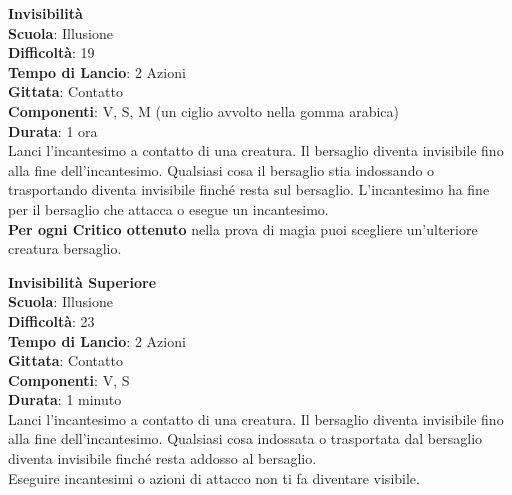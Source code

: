 \begin{multicols}{2}
\medskip\textbf{Invisibilità}\\
\textbf{Scuola}: Illusione\\
\textbf{Difficoltà}: 19\\
\textbf{Tempo di Lancio}: 2 Azioni\\
\textbf{Gittata}: Contatto\\
\textbf{Componenti}: V, S, M (un ciglio avvolto nella gomma arabica)\\
\textbf{Durata}: 1 ora \\
Lanci l'incantesimo a contatto di una creatura. Il bersaglio diventa invisibile fino alla fine dell'incantesimo. Qualsiasi cosa il bersaglio stia indossando o trasportando diventa invisibile finché resta sul bersaglio. L'incantesimo ha fine per il bersaglio che attacca o esegue un incantesimo.\\
\textbf{Per ogni Critico ottenuto} nella prova di magia puoi scegliere un'ulteriore creatura bersaglio.

\medskip\textbf{Invisibilità Superiore}\\
\textbf{Scuola}: Illusione\\
\textbf{Difficoltà}: 23\\
\textbf{Tempo di Lancio}: 2 Azioni\\
\textbf{Gittata}: Contatto\\
\textbf{Componenti}: V, S\\
\textbf{Durata}: 1 minuto\\
Lanci l'incantesimo a contatto di una creatura. Il bersaglio diventa invisibile fino alla fine dell'incantesimo. Qualsiasi cosa indossata o trasportata dal bersaglio diventa invisibile finché resta addosso al bersaglio.\\
Eseguire incantesimi o azioni di attacco non ti fa diventare visibile.


\end{multicols}
